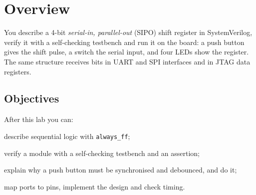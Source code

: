 \section{Overview}
You describe a 4-bit \emph{serial-in, parallel-out} (SIPO) shift register in SystemVerilog, verify it
with a self-checking testbench and run it on the board: a push button gives the shift pulse, a switch the
serial input, and four LEDs show the register. The same structure receives bits in UART and SPI
interfaces and in JTAG data registers.

\subsection*{Objectives}
After this lab you can:
\begin{objectives}
  \item describe sequential logic with \texttt{always\_ff};
  \item verify a module with a self-checking testbench and an assertion;
  \item explain why a push button must be synchronised and debounced, and do it;
  \item map ports to pins, implement the design and check timing.
\end{objectives}
